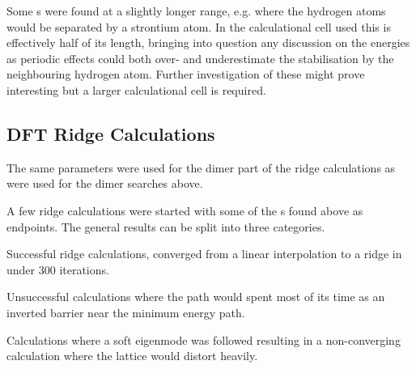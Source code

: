 Some s were found at a slightly longer range, e.g. where the hydrogen atoms would be separated by a strontium atom.
In the calculational cell used this is effectively half of its length, bringing into question any discussion on the energies as periodic effects could both over- and underestimate the stabilisation by the neighbouring hydrogen atom.
Further investigation of these might prove interesting but a larger calculational cell is required.

\subsection{DFT Ridge Calculations}
The same parameters were used for the dimer part of the ridge calculations as were used for the dimer searches above.

A few ridge calculations were started with some of the s found above as endpoints.
The general results can be split into three categories.
\bit
\item Successful ridge calculations, converged from a linear interpolation to a ridge in under 300 iterations.
\item Unsuccessful calculations where the path would spent most of its time as an inverted barrier near the minimum energy path.
\item Calculations where a soft eigenmode was followed resulting in a non-converging calculation where the lattice would distort heavily.
\eit

